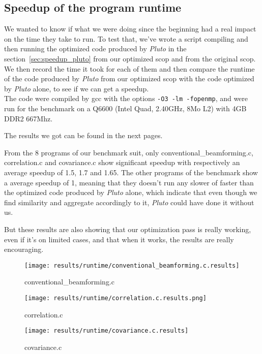 \documentclass[paper=a4, fontsize=11.5pt]{scrartcl}
\numberwithin{equation}{section}        %
\numberwithin{figure}{section}          %
\numberwithin{table}{section}               %
\begin{document}
\subsection{Speedup of the program runtime}

We wanted to know if what we were doing since the beginning had a real impact on the time they
take to run. To test that, we've wrote a script compiling and then running the optimized code
produced by \textit{Pluto} in the section~\ref{sec:speedup_pluto} from our optimized scop and
from the original scop. We then record the time it took for each of them and then compare
the runtime of the code produced by \textit{Pluto} from our optimized scop with the code
optimized by \textit{Pluto} alone, to see if we can get a speedup.\\
The code were compiled by gcc with the options \verb'-O3 -lm -fopenmp', and were run for
the benchmark on a Q6600 (Intel Quad, 2.40GHz, 8Mo L2) with 4GB DDR2 667Mhz.

The results we got can be found in the next pages. 

\bigskip

From the 8 programs of our benchmark suit, only conventional\_beamforming.c,
correlation.c and covariance.c show significant speedup with respectively an average speedup of
1.5, 1.7 and 1.65. The other programs of the benchmark show a average speedup of 1, meaning
that they doesn't run any slower of faster than the optimized code produced by \textit{Pluto} alone,
which indicate that even though we find similarity and aggregate accordingly to it, \textit{Pluto}
could have done it without us.

But these results are also showing that our optimization pass is really working, even if
it's on limited cases, and that when it works, the results are really encouraging.

\begin{figure}[H]
    \center
    \texttt{[image: results/runtime/conventional\_beamforming.c.results]}
    \caption{conventional\_beamforming.c}\label{fig:runtime:conv_beam}
\end{figure}
\begin{figure}[H]
    \center
    \texttt{[image: results/runtime/correlation.c.results.png]}
    \caption{correlation.c}\label{fig:runtime:correlation}
    \texttt{[image: results/runtime/covariance.c.results]}
    \caption{covariance.c}\label{fig:runtime:covariance}
\end{figure}
\restoregeometry
\end{document}

